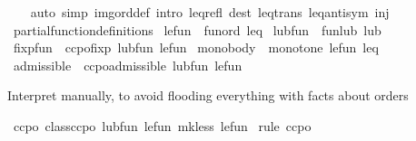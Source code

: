 \begin{isabellebody}
\ \ \isamarkupfalse%
\ {\isacharparenleft}{\kern0pt}auto\ simp{\isacharcolon}{\kern0pt}\ img{\isacharunderscore}{\kern0pt}ord{\isacharunderscore}{\kern0pt}def\ intro{\isacharcolon}{\kern0pt}\ leq{\isacharunderscore}{\kern0pt}refl\ dest{\isacharcolon}{\kern0pt}\ leq{\isacharunderscore}{\kern0pt}trans\ leq{\isacharunderscore}{\kern0pt}antisym\ inj{\isacharparenright}{\kern0pt}\isanewline
{}\isamarkupfalse%
%
\endisatagproof
{\isafoldproof}%
%
\isadelimproof
\isanewline
%
\endisadelimproof
\isanewline
{}\isamarkupfalse%
\ partial{\isacharunderscore}{\kern0pt}function{\isacharunderscore}{\kern0pt}definitions\isanewline
{}\isanewline
\isanewline
{}\isamarkupfalse%
\ {\isachardoublequoteopen}le{\isacharunderscore}{\kern0pt}fun\ {\isasymequiv}\ fun{\isacharunderscore}{\kern0pt}ord\ leq{\isachardoublequoteclose}\isanewline
{}\isamarkupfalse%
\ {\isachardoublequoteopen}lub{\isacharunderscore}{\kern0pt}fun\ {\isasymequiv}\ fun{\isacharunderscore}{\kern0pt}lub\ lub{\isachardoublequoteclose}\isanewline
{}\isamarkupfalse%
\ {\isachardoublequoteopen}fixp{\isacharunderscore}{\kern0pt}fun\ {\isasymequiv}\ ccpo{\isachardot}{\kern0pt}fixp\ lub{\isacharunderscore}{\kern0pt}fun\ le{\isacharunderscore}{\kern0pt}fun{\isachardoublequoteclose}\isanewline
{}\isamarkupfalse%
\ {\isachardoublequoteopen}mono{\isacharunderscore}{\kern0pt}body\ {\isasymequiv}\ monotone\ le{\isacharunderscore}{\kern0pt}fun\ leq{\isachardoublequoteclose}\isanewline
{}\isamarkupfalse%
\ {\isachardoublequoteopen}admissible\ {\isasymequiv}\ ccpo{\isachardot}{\kern0pt}admissible\ lub{\isacharunderscore}{\kern0pt}fun\ le{\isacharunderscore}{\kern0pt}fun{\isachardoublequoteclose}%
\begin{isamarkuptext}%
Interpret manually, to avoid flooding everything with facts about
  orders%
\end{isamarkuptext}\isamarkuptrue%
\isamarkupfalse%
\ ccpo{\isacharcolon}{\kern0pt}\ {\isachardoublequoteopen}class{\isachardot}{\kern0pt}ccpo\ lub{\isacharunderscore}{\kern0pt}fun\ le{\isacharunderscore}{\kern0pt}fun\ {\isacharparenleft}{\kern0pt}mk{\isacharunderscore}{\kern0pt}less\ le{\isacharunderscore}{\kern0pt}fun{\isacharparenright}{\kern0pt}{\isachardoublequoteclose}\isanewline
%
\isadelimproof
%
\endisadelimproof
%
\isatagproof
{}\isamarkupfalse%
\ {\isacharparenleft}{\kern0pt}rule\ ccpo{\isacharparenright}{\kern0pt}\isanewline
{}\isamarkupfalse%

\end{isabellebody}
